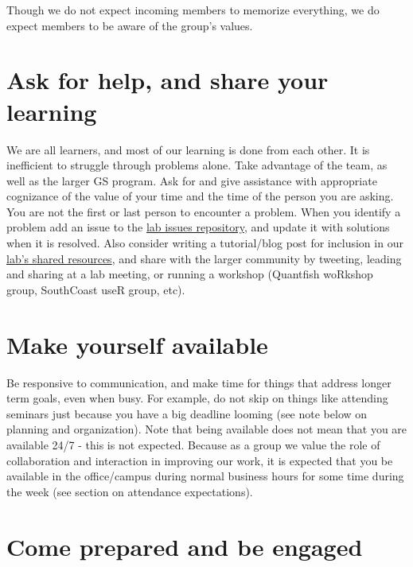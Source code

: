\documentclass[
  letterpaper,
  DIV=11,
  numbers=noendperiod]{scrreprt}
\begin{document}
Though we do not expect incoming members to memorize everything, we do
expect members to be aware of the group's values.

\hypertarget{ask-for-help-and-share-your-learning}{%
\section{Ask for help, and share your
learning}\label{ask-for-help-and-share-your-learning}}

We are all learners, and most of our learning is done from each other.
It is inefficient to struggle through problems alone. Take advantage of
the team, as well as the larger GS program. Ask for and give assistance
with appropriate cognizance of the value of your time and the time of
the person you are asking. You are not the first or last person to
encounter a problem. When you identify a problem add an issue to the
\href{www.github.com/thefaylab/lab-chat}{lab issues repository}, and
update it with solutions when it is resolved. Also consider writing a
tutorial/blog post for inclusion in our
\href{www.github.com/thefaylab/labhub}{lab's shared resources}, and
share with the larger community by tweeting, leading and sharing at a
lab meeting, or running a workshop (Quantfish woRkshop group, SouthCoast
useR group, etc).

\hypertarget{make-yourself-available}{%
\section{Make yourself available}\label{make-yourself-available}}

Be responsive to communication, and make time for things that address
longer term goals, even when busy. For example, do not skip on things
like attending seminars just because you have a big deadline looming
(see note below on planning and organization). Note that being available
does not mean that you are available 24/7 - this is not expected.
Because as a group we value the role of collaboration and interaction in
improving our work, it is expected that you be available in the
office/campus during normal business hours for some time during the week
(see section on attendance expectations).

\hypertarget{come-prepared-and-be-engaged}{%
\section{Come prepared and be
engaged}\label{come-prepared-and-be-engaged}}
\end{document}
